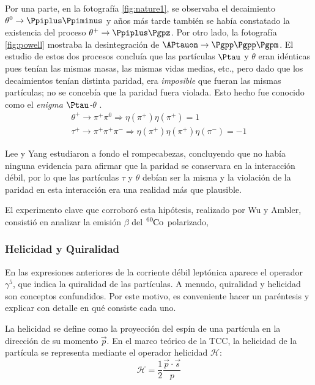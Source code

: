 Por una parte, en la fotografía \ref{fig:nature1}, se observaba el decaimiento $\theta^{0} \rightarrow \Ppiplus\Ppiminus$ y años más tarde también se había constatado la existencia del proceso $\theta^{+} \rightarrow \Ppiplus\Pgpz$. Por otro lado, la fotografía \ref{fig:powell} mostraba la desintegración de $\APtauon \rightarrow \Pgpp\Pgpp\Pgpm$.  El estudio de estos dos procesos concluía que las partículas $\Ptau$ y $\theta$ eran idénticas pues tenían las mismas masas, las mismas vidas medias, etc., pero dado que los decaimientos tenían distinta paridad, era \textit{imposible} que fueran las mismas partículas; no se concebía que la paridad fuera violada. Esto hecho fue conocido como el \textit{enigma $\Ptau$-$\theta$} \cite{Ferbel}.
\begin{equation}
\begin{gathered}
\theta^{+} \rightarrow \pi^{+}\pi^{0} \Rightarrow \eta\left(\pi^{+}\right) \eta\left(\pi^{+}\right) = 1 \\ 
\tau^{+} \rightarrow \pi^{+}\pi^{+}\pi^{-} \Rightarrow \eta\left(\pi^{+}\right) \eta\left(\pi^{+}\right) \eta\left(\pi^{-}\right) = -1
\end{gathered}
\end{equation}

Lee y Yang estudiaron a fondo el rompecabezas, concluyendo que no había ninguna evidencia para afirmar que la paridad se conservara en la interacción débil, por lo que las partículas $\tau$ y $\theta$ debían ser la misma y la violación de la paridad en esta interacción era una realidad más que plausible. 

El experimento clave que corroboró esta hipótesis, realizado por Wu y Ambler, consistió en analizar la emisión $\beta$ del $\tensor*[^{60}]{\mathrm{Co}}{}$ polarizado,

\subsubsection{Helicidad y Quiralidad}\label{sec:quirality}
En las expresiones anteriores de la corriente débil leptónica aparece el operador $\gamma^5$, que indica la quiralidad de las partículas. A menudo, quiralidad y helicidad son conceptos confundidos. Por este motivo, es conveniente hacer un paréntesis y explicar con detalle en qué consiste cada uno.

La helicidad se define como la proyección del espín de una partícula en la dirección de su momento $\vec{p}$. En el marco teórico de la TCC, la helicidad de la partícula se representa mediante el operador helicidad $\mathcal{H}$:
\begin{equation}
\mathcal{H}=\dfrac{1}{2} \dfrac{\vec{p} \cdot \vec{s}}{p}
\end{equation} 


